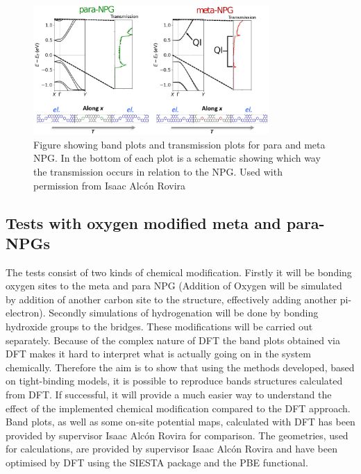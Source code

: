 \begin{figure}[ht]
	\centering
	\includegraphics[width=0.8\textwidth]{Figures/metapararesultdraft.eps}
	\caption{Figure showing band plots and transmission plots for para and meta NPG. In the bottom of each plot is a schematic showing which way the transmission occurs in relation to the NPG. Used with permission from Isaac Alcón Rovira}
	\label{metapara}
\end{figure}
\newpage
\subsection{Tests with oxygen modified meta and para-NPGs}\label{testintroduc}
The tests consist of two kinds of chemical modification. Firstly it will be bonding oxygen sites to the meta and para NPG (Addition of Oxygen will be simulated by addition of another carbon site to the structure, effectively adding another pi-electron). Secondly simulations of hydrogenation will be done by bonding hydroxide groups to the bridges. These modifications will be carried out separately. Because of the complex nature of DFT the band plots obtained via DFT makes it hard to interpret what is actually going on in the system chemically. Therefore the aim is to show that using the methods developed, based on tight-binding models, it is possible to reproduce bands structures calculated from DFT. If successful, it will provide a much easier way to understand the effect of the implemented chemical modification compared to the DFT approach. Band plots, as well as some on-site potential maps, calculated with DFT has been provided by supervisor Isaac Alcón Rovira for comparison. The geometries, used for calculations, are provided by supervisor Isaac Alcón Rovira and have been optimised by DFT using the SIESTA package\cite{Soler_2002} and the PBE functional\cite{perdew1996a}.
